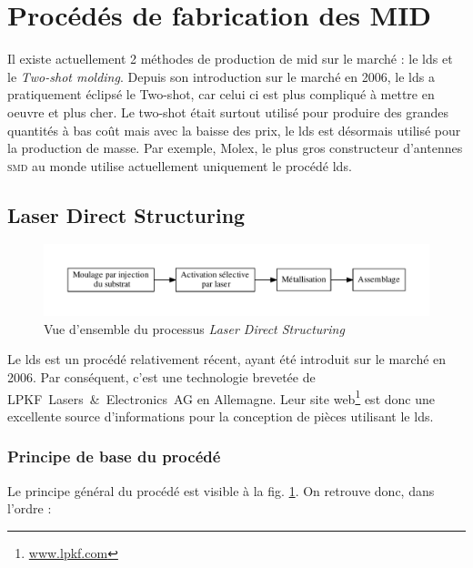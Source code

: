 \section{Procédés de fabrication des MID}
Il existe actuellement 2 méthodes de production de \gls{mid} sur le marché : le \gls{lds} et le \emph{Two-shot molding}.
Depuis son introduction sur le marché en 2006, le \gls{lds} a pratiquement éclipsé le Two-shot, car celui ci est plus compliqué à mettre en oeuvre et plus cher.
Le two-shot était surtout utilisé pour produire des grandes quantités à bas coût mais avec la baisse des prix, le \gls{lds} est désormais utilisé pour la production de masse.
Par exemple, Molex, le plus gros constructeur d'antennes \textsc{smd} au monde utilise actuellement uniquement le procédé \gls{lds}.

\subsection{Laser Direct Structuring}
\begin{figure}[h]
    \begin{center}
        \includegraphics[width=\textwidth]{images/lds_process}
        \caption{Vue d'ensemble du processus \emph{Laser Direct Structuring}}\label{fig:lds-process}
    \end{center}
\end{figure}
Le \gls{lds} est un procédé relativement récent, ayant été introduit sur le marché en 2006.
Par conséquent, c'est une technologie brevetée de LPKF~Lasers~\&~Electronics~AG en Allemagne.
Leur site web\footnote{\url{www.lpkf.com}} est donc une excellente source d'informations pour la conception de pièces utilisant le \gls{lds}.

\subsubsection{Principe de base du procédé}
Le principe général du procédé est visible à la fig.
\ref{fig:lds-process}.
On retrouve donc, dans l'ordre :


